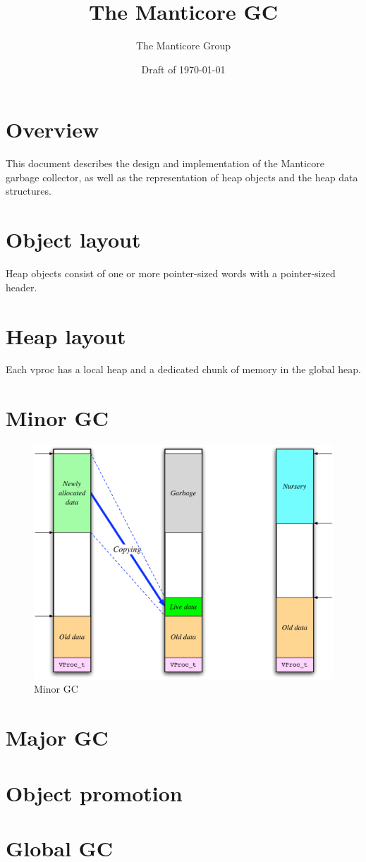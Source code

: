 \documentclass[11pt]{article}
\title{The Manticore GC}
\author{The Manticore Group}
\date{Draft of \today}
\begin{document}
\maketitle

\section{Overview}
This document describes the design and implementation of
the Manticore garbage collector, as well as the representation
of heap objects and the heap data structures.

\section{Object layout}
Heap objects consist of one or more pointer-sized words with
a pointer-sized header.

\section{Heap layout}
Each vproc has a local heap and a dedicated chunk of memory in the
global heap.

\section{Minor GC}

\begin{figure}[tp]
  \begin{center}
    \includegraphics[scale=0.5]{pictures/gc-minor-gc}
  \end{center}%
  \caption{Minor GC}
  \label{fig:minor-gc}
\end{figure}%

\section{Major GC}

\section{Object promotion}

\section{Global GC}
\end{document}
